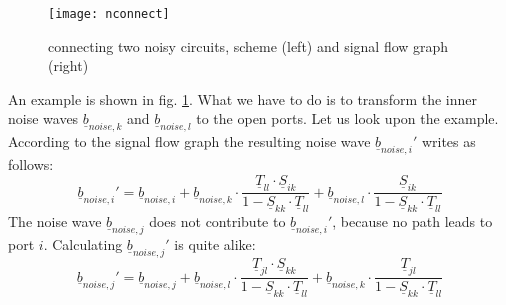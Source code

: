 \begin{figure}[ht]
\begin{center}
\texttt{[image: nconnect]}
\end{center}
\caption{connecting two noisy circuits, scheme (left) and signal flow graph (right)}
\label{fig:nconnect}
\end{figure}
\FloatBarrier

An example is shown in fig. \ref{fig:nconnect}.  What we have to do is
to transform the inner noise waves $\underline{b}_{noise,k}$ and
$\underline{b}_{noise,l}$ to the open ports.  Let us look upon the
example.  According to the signal flow graph the resulting noise wave
$\underline{b}_{noise,i}'$ writes as follows:
\begin{equation}
\underline{b}_{noise,i}' = \underline{b}_{noise,i} +
    \underline{b}_{noise,k}\cdot
            \frac{\underline{T}_{ll}\cdot \underline{S}_{ik}}{1-\underline{S}_{kk}\cdot\underline{T}_{ll}} +
    \underline{b}_{noise,l}\cdot
            \frac{\underline{S}_{ik}}{1-\underline{S}_{kk}\cdot\underline{T}_{ll}}
\label{eq:bnoiseI}
\end{equation}
The noise wave $\underline{b}_{noise,j}$ does not contribute to
$\underline{b}_{noise,i}'$, because no path leads to port $i$.
Calculating $\underline{b}_{noise,j}'$ is quite alike:
\begin{equation}
\underline{b}_{noise,j}' = \underline{b}_{noise,j} +
    \underline{b}_{noise,l}\cdot
            \frac{\underline{T}_{jl}\cdot \underline{S}_{kk}}{1-\underline{S}_{kk}\cdot\underline{T}_{ll}} +
    \underline{b}_{noise,k}\cdot
            \frac{\underline{T}_{jl}}{1-\underline{S}_{kk}\cdot\underline{T}_{ll}}
\label{eq:bnoiseJ}
\end{equation}

